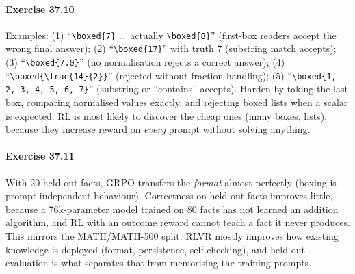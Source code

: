 \paragraph{Exercise 37.10} Examples: (1) ``\verb|\boxed{7}| \ldots\ actually \verb|\boxed{8}|''
(first-box readers accept the wrong final answer); (2) ``\verb|\boxed{17}|'' with truth 7
(substring match accepts); (3) ``\verb|\boxed{7.0}|'' (no normalisation rejects a correct
answer); (4) ``\verb|\boxed{\frac{14}{2}}|'' (rejected without fraction handling);
(5) ``\verb|\boxed{1, 2, 3, 4, 5, 6, 7}|'' (substring or ``contains'' accepts). Harden by
taking the last box, comparing normalised values exactly, and rejecting boxed lists when a
scalar is expected. RL is most likely to discover the cheap ones (many boxes, lists), because
they increase reward on \emph{every} prompt without solving anything.

\paragraph{Exercise 37.11} With 20 held-out facts, GRPO transfers the \emph{format} almost
perfectly (boxing is prompt-independent behaviour). Correctness on held-out facts improves
little, because a 76k-parameter model trained on 80 facts has not learned an addition
algorithm, and RL with an outcome reward cannot teach a fact it never produces. This mirrors
the MATH/MATH-500 split: RLVR mostly improves how existing knowledge is deployed (format,
persistence, self-checking), and held-out evaluation is what separates that from memorising
the training prompts.
